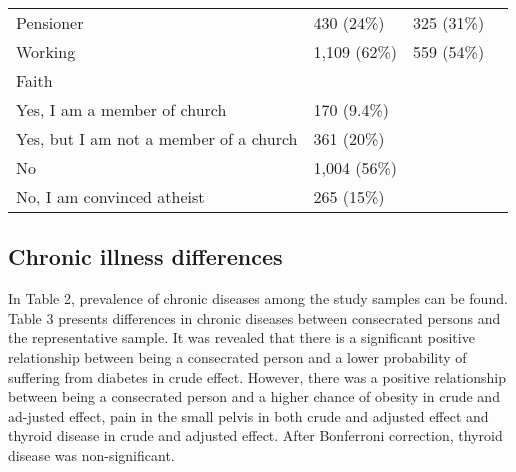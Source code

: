 \documentclass[ijerph,article,accept,moreauthors,pdftex]{mdpi}
\begin{document}
\begin{table}
{\begin{tabular}[t]{llll}
\hspace{1em}Pensioner & 430 (24\%) & 325 (31\%) & \\
\hspace{1em}Working & 1,109 (62\%) & 559 (54\%) & \\
Faith &  &  & \\
\hspace{1em}Yes, I am a member of church & 170 (9.4\%) &  & \\
\addlinespace
\hspace{1em}Yes, but I am not a member of a church & 361 (20\%) &  & \\
\hspace{1em}No & 1,004 (56\%) &  & \\
\hspace{1em}No, I am convinced atheist & 265 (15\%) &  & \\
\bottomrule
\end{tabular}}
\end{table}

\newpage

\hypertarget{chronic-illness-differences}{%
\subsection{Chronic illness
differences}\label{chronic-illness-differences}}

In Table 2, prevalence of chronic diseases among the study samples can
be found. Table 3 presents differences in chronic diseases between
consecrated persons and the representative sample. It was revealed that
there is a significant positive relationship between being a consecrated
person and a lower probability of suffering from diabetes in crude
effect. However, there was a positive relationship between being a
consecrated person and a higher chance of obesity in crude and ad-justed
effect, pain in the small pelvis in both crude and adjusted effect and
thyroid disease in crude and adjusted effect. After Bonferroni
correction, thyroid disease was non-significant.
\end{document}
